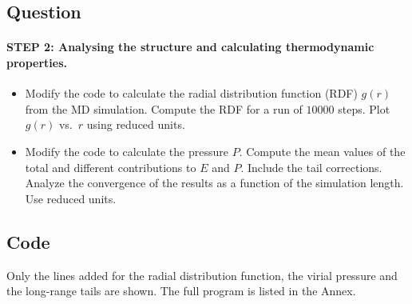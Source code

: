 \documentclass[11pt,a4paper]{article}
\begin{document}
\subsection{Question}
\paragraph{STEP 2: Analysing the structure and calculating thermodynamic properties.}
\begin{itemize}
  \item Modify the code to calculate the radial distribution function (RDF) $g(r)$ from the MD simulation. Compute the RDF for a run of $10000$ steps. Plot $g(r)$ vs.\ $r$ using reduced units.
  \item Modify the code to calculate the pressure $P$. Compute the mean values of the total and different contributions to $E$ and $P$. Include the tail corrections. Analyze the convergence of the results as a function of the simulation length. Use reduced units.
\end{itemize}

\subsection{Code}
Only the lines added for the radial distribution function, the virial pressure and the long-range tails are shown. The full program is listed in the Annex.










\end{document}
